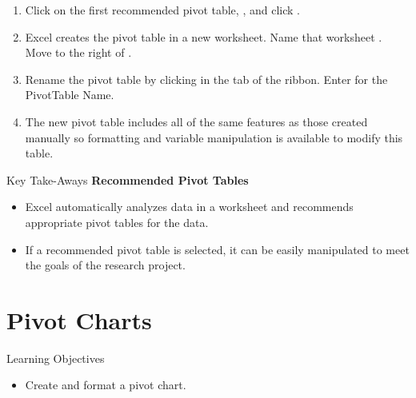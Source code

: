 \begin{enumerate}[resume]
	\item Click on the first recommended pivot table, , and click .
	\item Excel creates the pivot table in a new worksheet. Name that worksheet .
	Move  to the right of .
	\item Rename the pivot table by clicking  in the  tab of the ribbon. Enter  for the PivotTable Name.	
	\item The new pivot table includes all of the same features as those created manually so formatting and variable manipulation is available to modify this table.
\end{enumerate}

\begin{center}
	\begin{tkwbox}{Key Take-Aways}
		\textbf{Recommended Pivot Tables}
		\\
		\begin{itemize}
			\setlength{\itemsep}{0pt}
			\setlength{\parskip}{0pt}
			\setlength{\parsep}{0pt}
			
			\item Excel automatically analyzes data in a worksheet and recommends appropriate pivot tables for the data.
			\item If a recommended pivot table is selected, it can be easily manipulated to meet the goals of the research project.
			
		\end{itemize}
	\end{tkwbox}
\end{center}

\section{Pivot Charts}

\begin{center}
	\begin{objbox}{Learning Objectives}
		\begin{itemize}
			\setlength{\itemsep}{0pt}
			\setlength{\parskip}{0pt}
			\setlength{\parsep}{0pt}
			
			\item Create and format a pivot chart.
			
		\end{itemize}
	\end{objbox}
\end{center}

